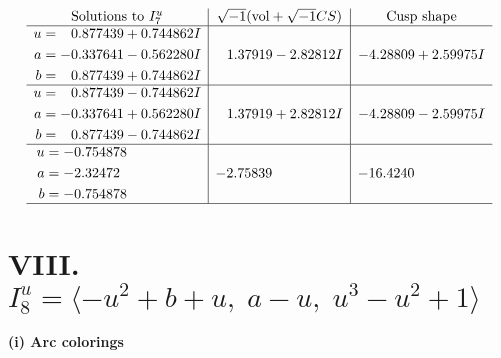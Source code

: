 \documentclass[1p]{elsarticle_modified}
\theoremstyle{definition}
\newcommand{\I}{\sqrt{-1}}
\begin{document}
$$\begin{array}{c|c|c}  
\text{Solutions to }I^u_{7}& \I (\text{vol} + \sqrt{-1}CS) & \text{Cusp shape}\\
 \hline 
\begin{aligned}
u &= \phantom{-}0.877439 + 0.744862 I \\
a &= -0.337641 - 0.562280 I \\
b &= \phantom{-}0.877439 + 0.744862 I\end{aligned}
 & \phantom{-}1.37919 - 2.82812 I & -4.28809 + 2.59975 I \\ \hline\begin{aligned}
u &= \phantom{-}0.877439 - 0.744862 I \\
a &= -0.337641 + 0.562280 I \\
b &= \phantom{-}0.877439 - 0.744862 I\end{aligned}
 & \phantom{-}1.37919 + 2.82812 I & -4.28809 - 2.59975 I \\ \hline\begin{aligned}
u &= -0.754878\phantom{ +0.000000I} \\
a &= -2.32472\phantom{ +0.000000I} \\
b &= -0.754878\phantom{ +0.000000I}\end{aligned}
 & -2.75839\phantom{ +0.000000I} & -16.4240\phantom{ +0.000000I}\\
 \hline 
 \end{array}$$\newpage\newpage\renewcommand{\arraystretch}{1}
\centering \section*{VIII. $I^u_{8}= \langle - u^2+b+u,\;a- u,\;u^3- u^2+1 \rangle$}
\flushleft \textbf{(i) Arc colorings}\\
\end{document}
